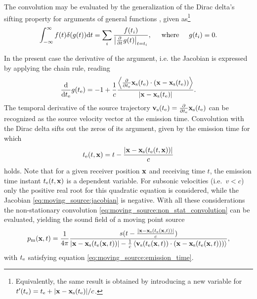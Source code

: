 The convolution may be evaluated by the generalization of the Dirac delta's sifting property for arguments of general functions \cite{Dowling1983, Crighton1992, Jackson1999}, given as\footnote{Equivalently, the same result is obtained by introducing a new variable for $t'(t_{\mathrm{e}}) = t_{\mathrm{e}} + |\mathbf{x}-\mathbf{x}_{\mathrm{s}}(t_{\mathrm{e}})|/c$.}
\begin{equation}
\int_{-\infty}^{\infty} f(t) \delta(g(t)) \mathrm{d} t = \sum_{i} \frac{f(t_i)}{\left| \frac{\partial}{\partial t} g(t) \right|_{t = t_i}}, \hspace{5mm} \text{where} \hspace{5mm} g(t_i) = 0.
\end{equation}

In the present case the derivative of the argument, i.e. the Jacobian is expressed by applying the chain rule, reading 
\begin{equation}
\label{eq:moving_source:jacobian}
\frac{\mathrm{d} }{\mathrm{d} t_{\mathrm{e}}} g(t_{\mathrm{e}}) = - 1 + \frac{1}{c} \frac{\left< \frac{\partial}{\partial t_{\mathrm{e}}} \mathbf{x}_{\mathrm{s}}(t_{\mathrm{e}}) \cdot (\mathbf{x}-\mathbf{x}_{\mathrm{s}}(t_{\mathrm{e}}))\right> }{|\mathbf{x}-\mathbf{x}_{\mathrm{s}}(t_{\mathrm{e}})|}.
\end{equation}
The temporal derivative of the source trajectory $\mathbf{v}_{\mathrm{s}}(t_{\mathrm{e}}) = \frac{\partial}{\partial t_{\mathrm{e}}}\mathbf{x}_{\mathrm{s}}(t_{\mathrm{e}})$ can be recognized as the source velocity vector at the emission time.
Convolution with the Dirac delta sifts out the zeros of its argument, given by the emission time for which
\begin{equation}
\label{eq:moving_source:emission_time}
t_{\mathrm{e}}(t,\mathbf{x}) = t - \frac{|\mathbf{x}-\mathbf{x}_{\mathrm{s}}(t_{\mathrm{e}}(t,\mathbf{x}))|}{c}
\end{equation}
holds.
Note that for a given receiver position $\mathbf{x}$ and receiving time $t$, the emission time instant $t_{\mathrm{e}}(t,\mathbf{x})$ is a dependent variable.
For subsonic velocities (i.e.\ $v<c$) only the positive real root for this quadratic equation is considered, while the Jacobian \eqref{eq:moving_source:jacobian} is negative.
With all these considerations the non-stationary convolution \eqref{eq:moving_source:non_stat_convolution} can be evaluated, yielding the sound field of a moving point source
\begin{equation}
p_{\mathrm{m}}(\mathbf{x},t) =
\frac{1}{4\pi} \frac{ s(t - \frac{|\mathbf{x}-\mathbf{x}_{\mathrm{s}}(t_{\mathrm{e}}(\mathbf{x},t))|}{c} ) }{|\mathbf{x}-\mathbf{x}_{\mathrm{s}}(t_{\mathrm{e}}(\mathbf{x},t))| - \frac{1}{c}\left< \mathbf{v}_{\mathrm{s}}(t_{\mathrm{e}}(\mathbf{x},t)) \cdot (\mathbf{x}-\mathbf{x}_{\mathrm{s}}(t_{\mathrm{e}}(\mathbf{x},t)))\right> },
\end{equation}
with $t_{\mathrm{e}}$ satisfying equation \eqref{eq:moving_source:emission_time}.

